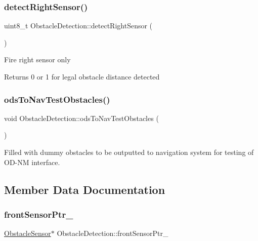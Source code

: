 \subsubsection{\texorpdfstring{detect\+Right\+Sensor()}{detectRightSensor()}}
{\footnotesize\ttfamily uint8\+\_\+t Obstacle\+Detection\+::detect\+Right\+Sensor (\begin{DoxyParamCaption}{ }\end{DoxyParamCaption})\hspace{0.3cm}{\ttfamily [private]}}

Fire right sensor only \begin{DoxyReturn}{Returns}
0 or 1 for legal obstacle distance detected 
\end{DoxyReturn}
\mbox{\label{class_obstacle_detection_a4977cf4929ce5b8ec1b42353df9bd2b7}} 
\subsubsection{\texorpdfstring{ods\+To\+Nav\+Test\+Obstacles()}{odsToNavTestObstacles()}}
{\footnotesize\ttfamily void Obstacle\+Detection\+::ods\+To\+Nav\+Test\+Obstacles (\begin{DoxyParamCaption}{ }\end{DoxyParamCaption})}



Filled with dummy obstacles to be outputted to navigation system for testing of O\+D-\/\+NM interface. 



\subsection{Member Data Documentation}
\mbox{\label{class_obstacle_detection_ab6e8507df02f3b6d9282d0253ac338f3}} 
\subsubsection{\texorpdfstring{front\+Sensor\+Ptr\+\_\+}{frontSensorPtr\_}}
{\footnotesize\ttfamily \mbox{\hyperlink{class_obstacle_sensor}{Obstacle\+Sensor}}$\ast$ Obstacle\+Detection\+::front\+Sensor\+Ptr\+\_\+\hspace{0.3cm}{\ttfamily [private]}}



